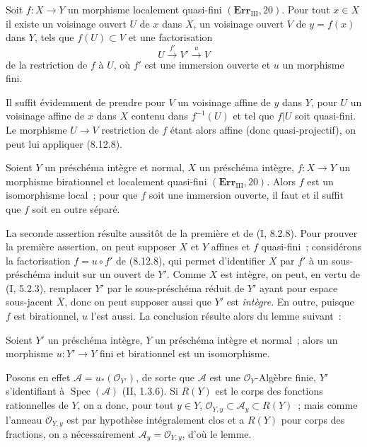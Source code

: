 \begin{corollary}[8.12.9]
\label{IV.8.12.9-fr}
Soit $f:X\to Y$ un morphisme localement quasi-fini
$(\mathbf{Err}_{\mathrm{III}}, 20)$. Pour tout $x\in X$ il existe un
voisinage ouvert $U$ de $x$ dans $X$, un voisinage ouvert $V$ de
$y=f(x)$ dans $Y$, tels que $f(U)\subset V$ et une factorisation
\[
U\xrightarrow{f'}V'\xrightarrow{u}V
\]
de la restriction de $f$ à $U$, où $f'$ est une immersion ouverte et $u$ un
morphisme fini.
\end{corollary}

Il suffit évidemment de prendre pour $V$ un voisinage affine de $y$ dans
$Y$, pour $U$ un voisinage affine de $x$ dans $X$ contenu dans $f^{-1}(U)$
et tel que $f|U$ soit quasi-fini. Le morphisme $U\to V$ restriction de $f$
étant alors affine (donc quasi-projectif), on peut lui appliquer (8.12.8).

\begin{corollary}[8.12.10]
\label{IV.8.12.10-fr}
Soient $Y$ un préschéma intègre et normal, $X$ un préschéma intègre,
$f:X\to Y$ un morphisme birationnel et localement quasi-fini
$(\mathbf{Err}_{\mathrm{III}}, 20)$. Alors $f$ est un isomorphisme local~;
pour que $f$ soit une immersion ouverte, il faut et il suffit que $f$ soit
en outre séparé.
\end{corollary}

La seconde assertion résulte aussitôt de la première et de (I, 8.2.8). Pour
prouver la première assertion, on peut supposer $X$ et $Y$ affines et $f$
quasi-fini~; considérons la factorisation $f=u\circ f'$ de (8.12.8), qui
permet d'identifier $X$ par $f'$ à un sous-préschéma induit sur un ouvert de
$Y'$. Comme $X$ est intègre, on peut, en vertu de (I, 5.2.3), remplacer
$Y'$ par le sous-préschéma réduit de $Y'$ ayant pour espace sous-jacent
$\overline X$, donc on peut supposer aussi que $Y'$ est \emph{intègre}. En
outre, puisque $f$ est birationnel, $u$ l'est aussi. La conclusion résulte
alors du lemme suivant~:

\begin{lemma}[8.12.10.1]
\label{IV.8.12.10.1-fr}
Soient $Y'$ un préschéma intègre, $Y$ un préschéma intègre et normal~; alors
un morphisme $u:Y'\to Y$ fini et birationnel est un isomorphisme.
\end{lemma}

Posons en effet $\mathcal A=u_*(\mathcal O_{Y'})$, de sorte que $\mathcal A$
est une $\mathcal O_Y$-Algèbre finie, $Y'$ s'identifiant à
$\operatorname{Spec}(\mathcal A)$ (II, 1.3.6). Si $R(Y)$ est le corps des
fonctions rationnelles de $Y$, on a donc, pour tout $y\in Y$,
$\mathcal O_{Y,y}\subset\mathcal A_y\subset R(Y)$~; mais comme l'anneau
$\mathcal O_{Y,y}$ est par hypothèse intégralement clos et a $R(Y)$ pour
corps des fractions, on a nécessairement
$\mathcal A_y=\mathcal O_{Y,y}$, d'où le lemme.

